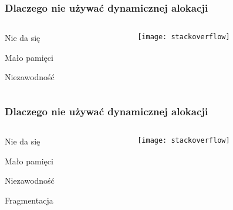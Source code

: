 \documentclass{beamer}
\makeatletter
\newenvironment{myitemize}{%
   \setlength{\topsep}{0pt}
   \setlength{\partopsep}{0pt}
   \renewcommand*{\@listi}{\leftmargin\leftmargini \parsep\z@ \topsep\z@ \itemsep\z@}
   \let\@listI\@listi
   \itemize
}{\enditemize}
\makeatother
\begin{document}
\begin{frame}[t]
    \frametitle{Dlaczego nie używać dynamicznej alokacji}

    \begin{columns}[t]
        \begin{column}[t]{0.35\textwidth}
            \begin{myitemize}
                \item Nie da się
                \item Mało pamięci
                \item Niezawodność
            \end{myitemize}
        \end{column}
        \begin{column}[t]{0.7\textwidth}
            \begin{center}
                \texttt{[image: stackoverflow]}\\
                \tiny \cite{stackoverflow} 
            \end{center}
        \end{column}
    \end{columns}
\end{frame}
\begin{frame}[t]
    \frametitle{Dlaczego nie używać dynamicznej alokacji}

    \begin{columns}[t]
        \begin{column}[t]{0.35\textwidth}
            \begin{myitemize}
                \item Nie da się
                \item Mało pamięci
                \item Niezawodność
                \item Fragmentacja
            \end{myitemize}
        \end{column}
        \begin{column}[t]{0.7\textwidth}
            \begin{center}
                \texttt{[image: stackoverflow]}\\
                \tiny \cite{stackoverflow} 
            \end{center}
        \end{column}
    \end{columns}
\end{frame}
\end{document}
